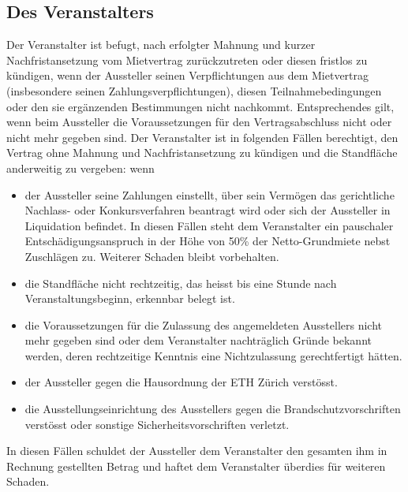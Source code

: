 \documentclass[8pt,a4paper]{article}
\begin{document}
\begin{multicols}{2}
\subsection{Des Veranstalters}
Der Veranstalter ist befugt, nach erfolgter Mahnung und kurzer Nachfristansetzung vom Mietvertrag zurückzutreten oder diesen fristlos zu kündigen, wenn der Aussteller seinen Verpflichtungen aus dem Mietvertrag (insbesondere seinen Zahlungsverpflichtungen), diesen Teilnahmebedingungen oder den sie ergänzenden Bestimmungen nicht nachkommt. Entsprechendes gilt, wenn beim Aussteller die Voraussetzungen für den Vertragsabschluss nicht oder nicht mehr gegeben sind. 
Der Veranstalter ist in folgenden Fällen berechtigt, den Vertrag ohne Mahnung und Nachfristansetzung zu kündigen und die Standfläche anderweitig zu vergeben: wenn 
\begin{itemize}
    \item der Aussteller seine Zahlungen einstellt, über sein Vermögen das gerichtliche Nachlass- oder Konkursverfahren beantragt wird oder sich der Aussteller in Liquidation befindet. In diesen Fällen steht dem Veranstalter ein pauschaler Entschädigungsanspruch in der Höhe von 50\% der Netto-Grundmiete nebst Zuschlägen zu. Weiterer Schaden bleibt vorbehalten.
    \item die Standfläche nicht rechtzeitig, das heisst bis eine Stunde nach Veranstaltungsbeginn, erkennbar belegt ist.
    \item die Voraussetzungen für die Zulassung des angemeldeten Ausstellers nicht mehr gegeben sind oder dem Veranstalter nachträglich Gründe bekannt werden, deren rechtzeitige Kenntnis eine Nichtzulassung gerechtfertigt hätten.
    \item der Aussteller gegen die Hausordnung der ETH Zürich verstösst.
    \item die Ausstellungseinrichtung des Ausstellers gegen die Brandschutzvorschriften verstösst oder sonstige Sicherheitsvorschriften verletzt.
\end{itemize}
In diesen Fällen schuldet der Aussteller dem Veranstalter den gesamten ihm in Rechnung gestellten Betrag und haftet dem Veranstalter überdies für weiteren Schaden. 


\end{multicols}
\end{document}
